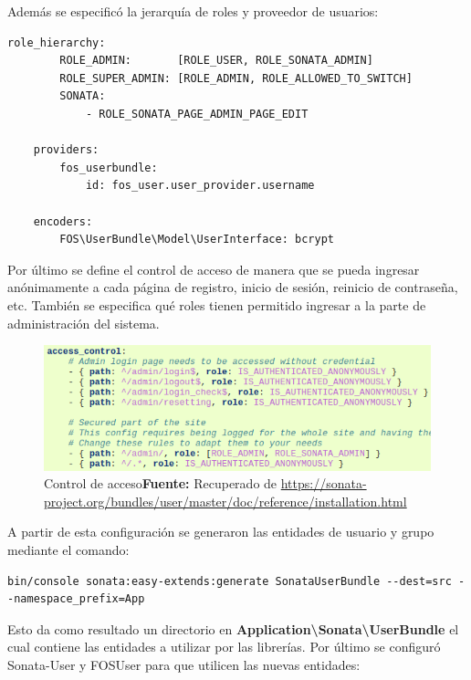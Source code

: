 \noindent
Además se especificó la jerarquía de roles y proveedor de usuarios:

\begin{lstlisting}[caption={Jerarquía de roles, tipo de encriptación y proveedor de usuarios\\Fuente: \sonatainstallation}]
    role_hierarchy:
        ROLE_ADMIN:       [ROLE_USER, ROLE_SONATA_ADMIN]
        ROLE_SUPER_ADMIN: [ROLE_ADMIN, ROLE_ALLOWED_TO_SWITCH]
        SONATA:
            - ROLE_SONATA_PAGE_ADMIN_PAGE_EDIT

    providers:
        fos_userbundle:
            id: fos_user.user_provider.username

    encoders:
        FOS\UserBundle\Model\UserInterface: bcrypt
\end{lstlisting}

\newpage
Por último se define el control de acceso de manera que se pueda ingresar anónimamente a cada página de registro, inicio de sesión, reinicio de contraseña,
etc.
También se especifica qué roles tienen permitido ingresar a la parte de administración del sistema.

\begin{figure}[h]
    \includegraphics[width=1\linewidth]{image/acl.png}
    \caption{Control de acceso\newline \textbf{Fuente:} Recuperado de \url{https://sonata-project.org/bundles/user/master/doc/reference/installation.html}}
    \label{fig:image/acl}
\end{figure}


A partir de esta configuración se generaron las entidades de usuario y grupo mediante el comando:

\begin{lstlisting}
bin/console sonata:easy-extends:generate SonataUserBundle --dest=src --namespace_prefix=App
\end{lstlisting}


Esto da como resultado un directorio en \textbf{Application\textbackslash Sonata\textbackslash UserBundle} el cual contiene las entidades a utilizar por las librerías.
Por último se configuró Sonata-User y FOSUser para que utilicen las nuevas entidades:


